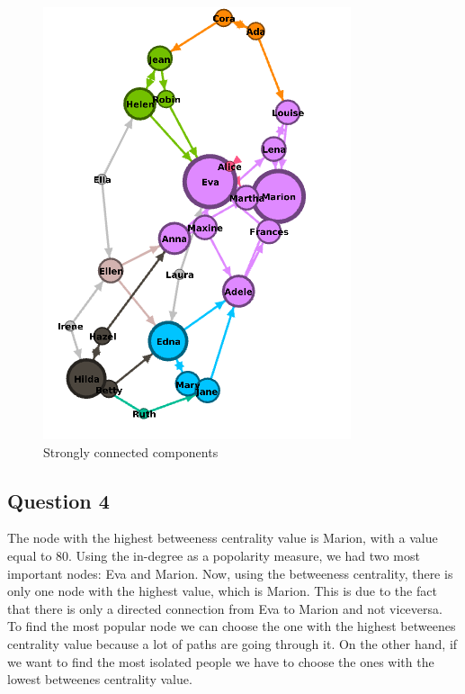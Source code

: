 \documentclass[a4paper]{article}
\begin{document}
\begin{figure}[!htpb]
\centering
\includegraphics[width=\textwidth]{res/img/graph}
\caption{Strongly connected components}
\label{fig:graph}
\end{figure}

\subsection{Question 4}

The node with the highest betweeness centrality value is Marion, with a value equal to 80. Using the in-degree as a popolarity measure, we had two most important nodes: Eva and Marion. Now, using the betweeness centrality, there is only one node with the highest value, which is Marion. This is due to the fact that there is only a directed connection from Eva to Marion and not viceversa. To find the most popular node we can choose the one with the highest betweenes centrality value because a lot of paths are going through it. On the other hand, if we want to find the most isolated people we have to choose the ones with the lowest betweenes centrality value.
\end{document}
